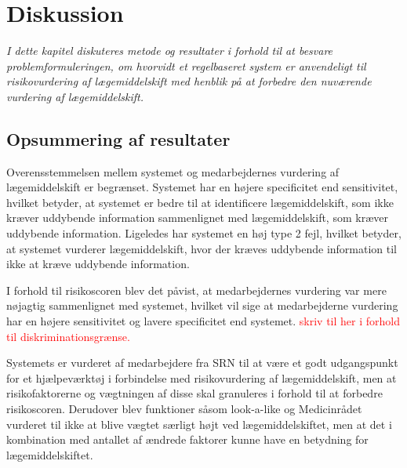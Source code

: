 
\chapter{Diskussion}
\textit{I dette kapitel diskuteres metode og resultater i forhold til at besvare problemformuleringen, om hvorvidt et regelbaseret system er anvendeligt til risikovurdering af lægemiddelskift med henblik på at forbedre den nuværende vurdering af lægemiddelskift.}


\section{Opsummering af resultater}
Overensstemmelsen mellem systemet og medarbejdernes vurdering af lægemiddelskift er begrænset. Systemet har en højere specificitet end sensitivitet, hvilket betyder, at systemet er bedre til at identificere lægemiddelskift, som ikke kræver uddybende information sammenlignet med lægemiddelskift, som kræver uddybende information. Ligeledes har systemet en høj type 2 fejl, hvilket betyder, at systemet vurderer lægemiddelskift, hvor der kræves uddybende information til ikke at kræve uddybende information. 

I forhold til risikoscoren blev det påvist, at medarbejdernes vurdering var mere nøjagtig sammenlignet med systemet, hvilket vil sige at medarbejderne vurdering har en højere sensitivitet og lavere specificitet end systemet. \textcolor{red}{skriv til her i forhold til diskriminationsgrænse.}

Systemets er vurderet af medarbejdere fra SRN til at være et godt udgangspunkt for et hjælpeværktøj i forbindelse med risikovurdering af lægemiddelskift, men at risikofaktorerne og vægtningen af disse skal granuleres i forhold til at forbedre risikoscoren. Derudover blev funktioner såsom look-a-like og Medicinrådet vurderet til ikke at blive vægtet særligt højt ved lægemiddelskiftet, men at det i kombination med antallet af ændrede faktorer kunne have en betydning for lægemiddelskiftet.

